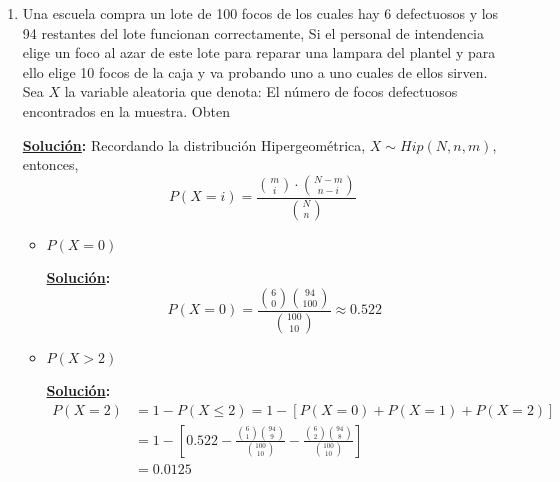 \documentclass[11pt,letterpaper]{report}
\newcommand{\sol}{\textbf{\underline{Solución}: }} %
\begin{document}
\begin{enumerate}
\item Una escuela compra un lote de 100 focos de los cuales hay 6 defectuosos y los 94 restantes del lote funcionan
correctamente, Si el personal de intendencia elige un foco al azar de este lote para reparar una lampara del plantel y
para ello elige 10 focos de la caja y va probando uno a uno cuales de ellos sirven. Sea $X$ la variable aleatoria
que denota: El número de focos defectuosos encontrados en la muestra. Obten

\sol Recordando la distribución Hipergeométrica, $X \sim Hip(N,n,m)$, entonces,
\[
    P(X=i) = \frac{\binom{m}{i}\cdot\binom{N-m}{n-i}}{\binom{N}{n}}
\]

\begin{itemize}
    \item $P(X = 0)$
    
    \sol
    \[
        P(X=0) = \frac{\binom{6}{0}\binom{94}{100}}{\binom{100}{10}} \approx 0.522
    \]

    \item $P(X > 2)$
    
    \sol
    \begin{align*}
        P(X=2)
            &= 1 - P(X \leq 2) = 1 - [P(X=0) + P(X=1) + P(X=2)]\\
            &= 1 - [0.522 - \frac{\binom{6}{1}\binom{94}{9}}{\binom{100}{10}} - \frac{\binom{6}{2}\binom{94}{8}}{\binom{100}{10}}]\\
            &= 0.0125
    \end{align*}

\end{itemize}
    

\end{enumerate}





\end{document}
